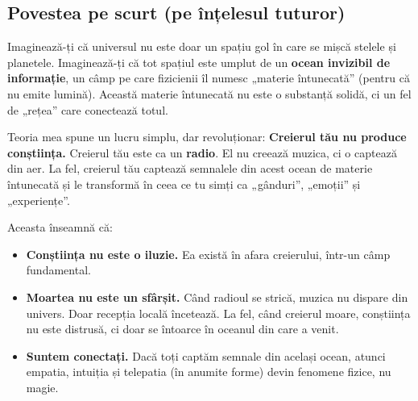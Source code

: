 \documentclass[11pt,a4paper]{article}
\begin{document}
\subsection{Povestea pe scurt (pe înțelesul tuturor)}
Imaginează-ți că universul nu este doar un spațiu gol în care se mișcă stelele și planetele. Imaginează-ți că tot spațiul este umplut de un \textbf{ocean invizibil de informație}, un câmp pe care fizicienii îl numesc „materie întunecată” (pentru că nu emite lumină). Această materie întunecată nu este o substanță solidă, ci un fel de „rețea” care conectează totul.

Teoria mea spune un lucru simplu, dar revoluționar: \textbf{Creierul tău nu produce conștiința.} Creierul tău este ca un \textbf{radio}. El nu creează muzica, ci o captează din aer. La fel, creierul tău captează semnalele din acest ocean de materie întunecată și le transformă în ceea ce tu simți ca „gânduri”, „emoții” și „experiențe”.

Aceasta înseamnă că:
\begin{itemize}
    \item \textbf{Conștiința nu este o iluzie.} Ea există în afara creierului, într-un câmp fundamental.
    \item \textbf{Moartea nu este un sfârșit.} Când radioul se strică, muzica nu dispare din univers. Doar recepția locală încetează. La fel, când creierul moare, conștiința nu este distrusă, ci doar se întoarce în oceanul din care a venit.
    \item \textbf{Suntem conectați.} Dacă toți captăm semnale din același ocean, atunci empatia, intuiția și telepatia (în anumite forme) devin fenomene fizice, nu magie.
\end{itemize}
\end{document}
